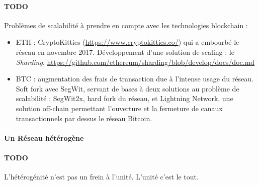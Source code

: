 \paragraph{TODO} Problèmes de scalabilité à prendre en compte avec les technologies blockchain :

\begin{itemize}
    \item ETH : CryptoKitties (\url{https://www.cryptokitties.co/}) qui a embourbé le réseau en novembre 2017. 
    Développement d'une solution de scaling : le \emph{Sharding}, \url{https://github.com/ethereum/sharding/blob/develop/docs/doc.md}
    \item BTC : augmentation des frais de transaction due à l'intense usage du réseau.
    Soft fork avec SegWit, servant de bases à deux solutions au problème de scalabilité : SegWit2x, hard fork du réseau,
    et Lightning Network, une solution off-chain permettant l'ouverture et la fermeture de canaux transactionnels par dessus
    le réseau Bitcoin.
\end{itemize}


\paragraph{Un Réseau hétérogène}

\paragraph{TODO} L'hétérogénité n'est pas un frein à l'unité. L'unité c'est le tout.
